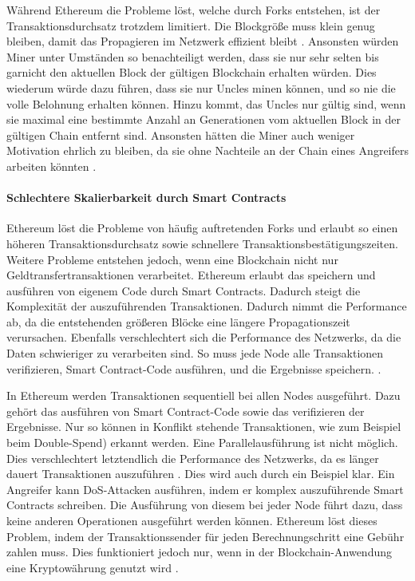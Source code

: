 Während Ethereum die Probleme löst, welche durch Forks entstehen, ist der Transaktionsdurchsatz trotzdem limitiert. Die Blockgröße muss klein genug bleiben, damit das Propagieren im Netzwerk effizient bleibt \cite{SchererPerformanceScalabilityBlockchain2017}. Ansonsten würden Miner unter Umständen so benachteiligt werden, dass sie nur sehr selten bis garnicht den aktuellen Block der gültigen Blockchain erhalten würden. Dies wiederum würde dazu führen, dass sie nur Uncles minen können, und so nie die volle Belohnung erhalten können. Hinzu kommt, das Uncles nur gültig sind, wenn sie maximal eine bestimmte Anzahl an Generationen vom aktuellen Block in der gültigen Chain entfernt sind. Ansonsten hätten die Miner auch weniger Motivation ehrlich zu bleiben, da sie ohne Nachteile an der Chain eines Angreifers arbeiten könnten \cite{EthereumTeamEthereumWhitePaper2017}.

\paragraph{Schlechtere Skalierbarkeit durch Smart Contracts}
Ethereum löst die Probleme von häufig auftretenden Forks und erlaubt so einen höheren Transaktionsdurchsatz sowie schnellere Transaktionsbestätigungszeiten. Weitere Probleme entstehen jedoch, wenn eine Blockchain nicht nur Geldtransfertransaktionen verarbeitet. Ethereum erlaubt das speichern und ausführen von eigenem Code durch Smart Contracts. Dadurch steigt die Komplexität der auszuführenden Transaktionen. Dadurch nimmt die Performance ab, da die entstehenden größeren Blöcke eine längere Propagationszeit verursachen. Ebenfalls verschlechtert sich die Performance des Netzwerks, da die Daten schwieriger zu verarbeiten sind. So muss jede Node alle Transaktionen verifizieren, Smart Contract-Code ausführen, und die Ergebnisse speichern. \cite{SchererPerformanceScalabilityBlockchain2017}. 

In Ethereum werden Transaktionen sequentiell bei allen Nodes ausgeführt. Dazu gehört das ausführen von Smart Contract-Code sowie das verifizieren der Ergebnisse. Nur so können in Konflikt stehende Transaktionen, wie zum Beispiel beim Double-Spend) erkannt werden. Eine Parallelausführung ist nicht möglich. Dies verschlechtert letztendlich die Performance des Netzwerks, da es länger dauert Transaktionen auszuführen \cite{SchererPerformanceScalabilityBlockchain2017}. Dies wird auch durch ein Beispiel klar. Ein Angreifer kann DoS-Attacken ausführen, indem er komplex auszuführende Smart Contracts schreiben. Die Ausführung von diesem bei jeder Node führt dazu, dass keine anderen Operationen ausgeführt werden können. Ethereum löst dieses Problem, indem der Transaktionssender für jeden Berechnungschritt eine Gebühr zahlen muss. Dies funktioniert jedoch nur, wenn in der Blockchain-Anwendung eine Kryptowährung genutzt wird \cite{VukolicRethinkingPermissionedBlockchains2017}. 

